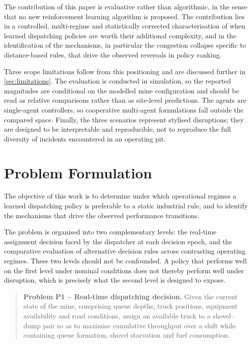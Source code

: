 \documentclass[11pt,a4paper]{article}
\begin{document}
The contribution of this paper is evaluative rather than algorithmic, in the sense that no new reinforcement learning algorithm is proposed. The contribution lies in a controlled, multi-regime and statistically corrected characterisation of when learned dispatching policies are worth their additional complexity, and in the identification of the mechanisms, in particular the congestion collapse specific to distance-based rules, that drive the observed reversals in policy ranking.

Three scope limitations follow from this positioning and are discussed further in \cref{sec:limitations}. The evaluation is conducted in simulation, so the reported magnitudes are conditional on the modelled mine configuration and should be read as relative comparisons rather than as site-level predictions. The agents are single-agent controllers, so cooperative multi-agent formulations \cite{Zhao2025} fall outside the compared space. Finally, the three scenarios represent stylised disruptions; they are designed to be interpretable and reproducible, not to reproduce the full diversity of incidents encountered in an operating pit.
\section{Problem Formulation}
\label{sec:formulation}

The objective of this work is to determine under which operational regimes a learned dispatching policy is preferable to a static industrial rule, and to identify the mechanisms that drive the observed performance transitions.

The problem is organised into two complementary levels: the real-time assignment decision faced by the dispatcher at each decision epoch, and the comparative evaluation of alternative decision rules across contrasting operating regimes. These two levels should not be confounded. A policy that performs well on the first level under nominal conditions does not thereby perform well under disruption, which is precisely what the second level is designed to expose.

\begin{quote}
\textbf{Problem P1 -- Real-time dispatching decision.}
Given the current state of the mine, comprising queue depths, truck positions, equipment availability and road conditions, assign an available truck to a shovel--dump pair so as to maximise cumulative throughput over a shift while containing queue formation, shovel starvation and fuel consumption.
\end{quote}
\end{document}

